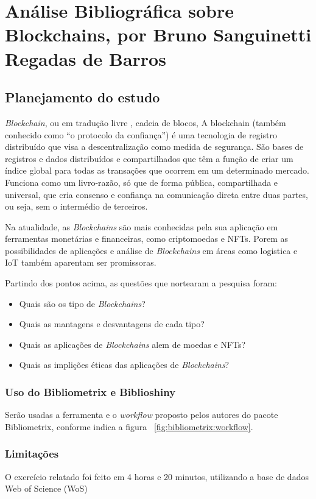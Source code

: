 \chapter{Análise Bibliográfica sobre Blockchains, por Bruno Sanguinetti Regadas de Barros\label{chap:bibliometria:Jaxiii}}

\section{Planejamento do estudo}

\textit{Blockchain}, ou em tradução livre , cadeia de blocos, A blockchain (também conhecido como “o protocolo da confiança”) é uma tecnologia de registro distribuído que visa a descentralização como medida de segurança. 
São bases de registros e dados distribuídos e compartilhados que têm a função de criar um índice global para todas as transações que ocorrem em um determinado mercado. Funciona como um livro-razão, só que de forma pública, compartilhada e universal, que cria consenso e confiança na comunicação direta entre duas partes, ou seja, sem o intermédio de terceiros.

Na atualidade, as \textit{Blockchains} são mais conhecidas pela sua aplicação em ferramentas monetárias e financeiras, como criptomoedas e NFTs. Porem as possibilidades de aplicações e análise de \textit{Blockchains} em áreas como logistica e IoT
também aparentam ser promissoras.


Partindo dos pontos acima, as questões que nortearam a pesquisa foram:
\begin{itemize}
    \item Quais são os tipo de \textit{Blockchains}?
    \item Quais as mantagens e desvantagens de cada tipo?
    \item Quais as aplicações de \textit{Blockchains} alem de moedas e NFTs? 
    \item Quais as implições éticas das aplicações de \textit{Blockchains}?
\end{itemize}

\subsection{Uso do Bibliometrix e Biblioshiny}
Serão usadas a ferramenta e o \textit{workflow} proposto pelos autores do pacote Bibliometrix, conforme indica a figura ~\ref{fig:bibliometrix:workflow}.

\subsection{Limitações} O exercício relatado foi feito em 4 horas e 20 minutos, utilizando a base de dados Web of Science (WoS)


